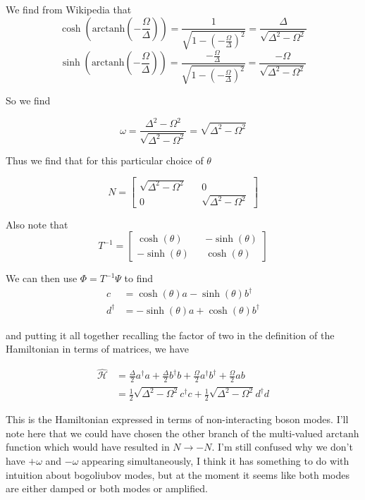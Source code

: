 \documentclass[12pt]{article}
\begin{document}
We find from Wikipedia that 
\[\cosh(\text{arctanh}( -\frac{\Omega}{\Delta})) = \frac{1}{\sqrt{1-(-\frac{\Omega}{\Delta})^2}} = \frac{\Delta}{\sqrt{\Delta^2 - \Omega^2}}\]
\[\sinh(\text{arctanh}( -\frac{\Omega}{\Delta})) = \frac{-\frac{\Omega}{\Delta}}{\sqrt{1-( -\frac{\Omega}{\Delta})^2}} = \frac{-\Omega}{\sqrt{\Delta^2 - \Omega^2}}\]

So we find

\begin{equation}
\omega = \frac{\Delta^2 - \Omega^2}{\sqrt{\Delta^2-\Omega^2}} = \sqrt{\Delta^2-\Omega^2}
\end{equation}

Thus we find that for this particular choice of $\theta$

\begin{equation}
N = \begin{bmatrix}
\sqrt{\Delta^2-\Omega^2} && 0\\
0 && \sqrt{\Delta^2-\Omega^2}
\end{bmatrix}
\end{equation}

Also note that
\begin{equation}
T^{-1} = \begin{bmatrix}
	\cosh(\theta) && -\sinh(\theta)\\
	-\sinh(\theta) && \cosh(\theta)
\end{bmatrix}
\end{equation}

We can then use $\Phi = T^{-1}\Psi$ to find
\begin{align}
c &= \cosh(\theta) a -\sinh(\theta) b^{\dag}\\
d^{\dag} &= -\sinh(\theta) a + \cosh(\theta) b^{\dag}
\end{align}

and putting it all together recalling the factor of two in the definition of the Hamiltonian in terms of matrices, we have

\begin{align}
\hat{\mathcal{H}} &= \frac{\Delta}{2} a^{\dagger}a + \frac{\Delta}{2} b^\dag b + \frac{\Omega}{2} a^\dag b^{\dag} + \frac{\Omega}{2} ab\\
&= \frac{1}{2} \sqrt{\Delta^2-\Omega^2} c^{\dag}c + \frac{1}{2} \sqrt{\Delta^2-\Omega^2} d^{\dag}d
\end{align}

This is the Hamiltonian expressed in terms of non-interacting boson modes. I'll note here that we could have chosen the other branch of the multi-valued $\text{arctanh}$ function which would have resulted in $N\rightarrow-N$. I'm still confused why we don't have $+\omega$ and $-\omega$ appearing simultaneously, I think it has something to do with intuition about bogoliubov modes, but at the moment it seems like both modes are either damped or both modes or amplified.
\end{document}
